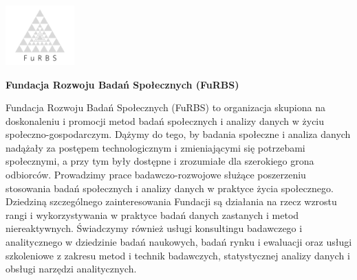 \documentclass[\main/boa.tex]{subfiles}
\begin{document}
	
	\begin{minipage}[t]{0.915\textwidth}
		\center     
		\includegraphics[width=100px]{img/logos.bw/furbs.png} 
	\end{minipage}
	
	\Large \textbf {Fundacja Rozwoju Badań Społecznych (FuRBS)}
	
	
	\vskip 0.3cm
	\normalsize 
	Fundacja Rozwoju Badań Społecznych (FuRBS) to organizacja skupiona na doskonaleniu i promocji metod badań społecznych i analizy danych w życiu społeczno-gospodarczym. Dążymy do tego, by badania społeczne i analiza danych nadążały za postępem technologicznym i zmieniającymi się potrzebami społecznymi, a przy tym były dostępne i zrozumiałe dla szerokiego grona odbiorców. Prowadzimy prace badawczo-rozwojowe służące poszerzeniu stosowania badań społecznych i analizy danych w praktyce życia społecznego. Dziedziną szczególnego zainteresowania Fundacji są działania na rzecz wzrostu rangi i wykorzystywania w praktyce badań danych zastanych i metod niereaktywnych. Świadczymy również usługi konsultingu badawczego i analitycznego w dziedzinie badań naukowych, badań rynku i ewaluacji oraz usługi szkoleniowe z zakresu metod i technik badawczych, statystycznej analizy danych i obsługi narzędzi analitycznych.
	
	\vskip 1.5cm
\end{document}
